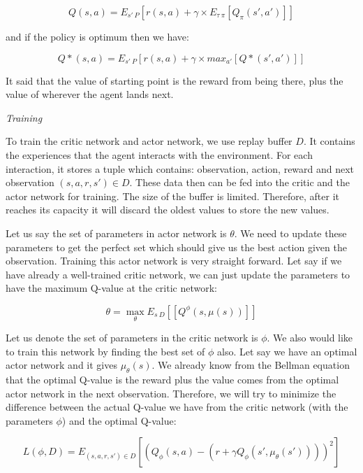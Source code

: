 \documentclass[conference]{IEEEtran}
\begin{document}
\begin{equation}
    Q(s,a) = E_{s' ~ P} [r(s,a) + \gamma \times E_{\tau ~ \pi}[Q_{\pi}(s', a')]]
\end{equation}

and if the policy is optimum then we have: 

\begin{equation}
    \label{eqn:optimum_Bellman_Q_function}
    Q*(s,a) = E_{s' ~ P} [r(s,a) + \gamma \times max_{a'} [Q*(s', a')]]
\end{equation}

It said that the value of starting point is the reward from being there, plus the value of wherever the agent lands next.

\textit{Training}

To train the critic network and actor network, we use replay buffer $D$. It contains the experiences that the agent interacts with the environment. For each interaction, it stores a tuple which contains: observation, action, reward and next observation $(s,a,r,s') \in D$. These data then can be fed into the critic and the actor network for training. The size of the buffer is limited. Therefore, after it reaches its capacity it will discard the oldest values to store the new values. 

Let us say the set of parameters in actor network is $\theta$. We need to update these parameters to get the perfect set which should give us the best action given the observation. Training this actor network is very straight forward. Let say if we have already a well-trained critic network, we can just update the parameters to have the maximum Q-value at the critic network: 

\begin{equation}
    \theta = \max_\theta E_{s ~ D} [[Q^{\phi}(s, \mu(s))]]
\end{equation}

Let us denote the set of parameters in the critic network is $\phi$. We also would like to train this network by finding the best set of $\phi$ also. Let say we have an optimal actor network and it gives $\mu_\theta(s)$. We already know from the Bellman equation that the optimal Q-value is the reward plus the value comes from the optimal actor network in the next observation. Therefore, we will try to minimize the difference between the actual Q-value we have from the critic network (with the parameters $\phi$) and the optimal Q-value: 

\begin{equation}
    L(\phi, D) = E_{(s,a,r,s') \in D}  [(Q_\phi(s,a) - (r + \gamma Q_\phi(s',\mu_\theta(s'))))^2]  
\end{equation}
\end{document}
